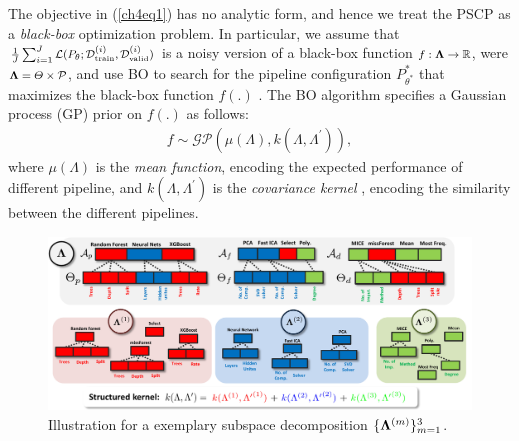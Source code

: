 \documentclass [PhD] {uclathes}
\begin{document}
The objective in (\ref{ch4eq1}) has no analytic form, and hence we treat the PSCP as a {\it black-box} optimization problem. In particular, we assume that $\mbox{\footnotesize $\frac{1}{J}\sum_{i=1}^{J}\mathcal{L}(P_\theta;\mathcal{D}^{(i)}_{\mbox{\tiny train}},\mathcal{D}^{(i)}_{\tiny \mbox{valid}})$}$ is a noisy version of a black-box function $\mbox{\footnotesize $f: {\bf \Lambda} \to \mathbb{R}$}$, were $\mbox{\footnotesize ${\bf \Lambda} = \Theta \times \mathcal{P}$}$, and use BO to search for the pipeline configuration $P^*_{\theta^*}$ that maximizes the black-box function $f(.)$ \cite{snoek2012practical}. The BO algorithm specifies a Gaussian process (GP) prior on $f(.)$ as follows:
\begin{align}
f \sim \mathcal{GP}(\mu(\Lambda),k(\Lambda,\Lambda^{\prime})),
\label{eq10X}
\end{align}
where $\mu(\Lambda)$ is the {\it mean function}, encoding the expected performance of different pipeline, and $k(\Lambda,\Lambda^{\prime})$ is the {\it covariance kernel} \cite{rasmussen2006gaussian}, encoding the similarity between the different pipelines.

\begin{figure}[t]
\centering
\includegraphics[width=6in]{ch4Fig2.pdf}
\caption{Illustration for a exemplary subspace decomposition $\{{\bf \Lambda}^{(m)}\}^3_{m=1}$.}
\label{ch4fig2}
\end{figure}
\end{document}
